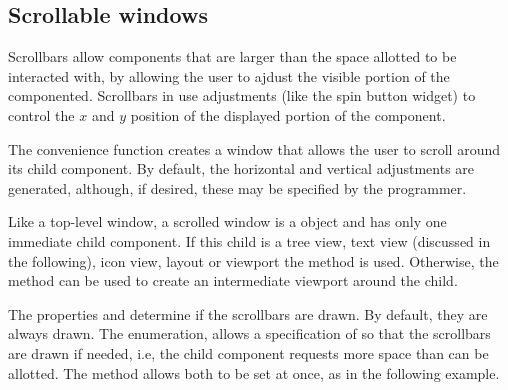 \subsection{Scrollable windows}
\label{sec:RGtk2:scroll-windows}

Scrollbars allow components that are larger than the space allotted to
be interacted with, by allowing the user to ajdust the visible portion
of the componented. Scrollbars in \GTK\/ use adjustments (like the
spin button widget) to control the $x$ and $y$ position of the
displayed portion of the component.

The convenience function  creates a
window that allows the user to scroll around its  child component. By
default, the horizontal and vertical adjustments are generated,
although, if desired, these
may be specified by the programmer.

Like a top-level window, a scrolled window is a  object
and has only one immediate child component. If this child is a tree
view, text view (discussed in the following), icon view, layout or
viewport the  method is used. Otherwise, the
method  can be used to create an
intermediate viewport around the child.


The properties  and 
determine if the scrollbars are drawn. By default, they are always
drawn. The  enumeration, allows a specification of
 so that the scrollbars are drawn if needed, i.e, the
child component requests more space than can be allotted. The
 method allows both to be set at
once, as in the following example.

